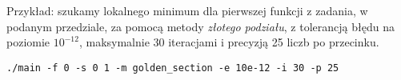 \documentclass[a4paper,11pt]{article}
\begin{document}
    Przykład: szukamy lokalnego minimum dla pierwszej funkcji z zadania, w podanym przedziale, za pomocą metody \emph{złotego podziału}, z tolerancją błędu na poziomie $10^{-12}$, maksymalnie 30 iteracjami i precyzją 25 liczb po przecinku.
    \begin{center}
      \texttt{./main -f 0 -s 0 1 -m golden\_section -e 10e-12 -i 30 -p 25}
    \end{center}    
\end{document}
